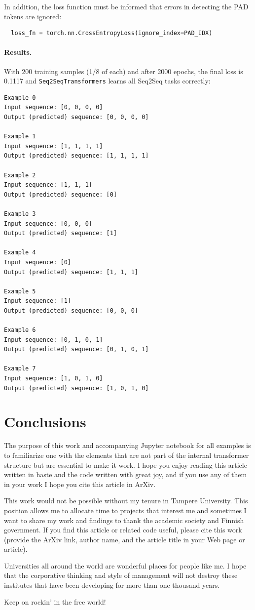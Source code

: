 \documentclass[final]{article}
\begin{document}
In addition, the loss function must be informed that errors in detecting the PAD tokens are ignored:
\begin{lstlisting}
  loss_fn = torch.nn.CrossEntropyLoss(ignore_index=PAD_IDX)
\end{lstlisting}

\paragraph{Results.} With 200 training samples (1/8 of each) and after 2000 epochs, the final loss is 0.1117 and \texttt{Seq2SeqTransformers} learns all Seq2Seq tasks correctly:
\begin{verbatim}
Example 0
Input sequence: [0, 0, 0, 0]
Output (predicted) sequence: [0, 0, 0, 0]

Example 1
Input sequence: [1, 1, 1, 1]
Output (predicted) sequence: [1, 1, 1, 1]

Example 2
Input sequence: [1, 1, 1]
Output (predicted) sequence: [0]

Example 3
Input sequence: [0, 0, 0]
Output (predicted) sequence: [1]

Example 4
Input sequence: [0]
Output (predicted) sequence: [1, 1, 1]

Example 5
Input sequence: [1]
Output (predicted) sequence: [0, 0, 0]

Example 6
Input sequence: [0, 1, 0, 1]
Output (predicted) sequence: [0, 1, 0, 1]

Example 7
Input sequence: [1, 0, 1, 0]
Output (predicted) sequence: [1, 0, 1, 0]
\end{verbatim}

\section{Conclusions}
The purpose of this work and accompanying Jupyter notebook for all examples is to familiarize one with the elements that are not part of the internal transformer structure but are essential to make it work. I hope you enjoy reading this article written in haste and the code written with great joy, and if you use any of them in your work I hope you cite this article in ArXiv.

\begin{ack}
This work would not be possible without my tenure in Tampere
University. This position allows me to allocate time to projects that interest me and sometimes I want to share my work and findings to thank the academic society and Finnish government. If you find this article or
related code useful, please cite this work (provide the ArXiv link, author name, and the article title in your Web page or article).

Universities all around the world are wonderful places for people like
me. I hope that the corporative thinking and style of management will
not destroy these institutes that have been developing for more than one
thousand years.

Keep on rockin' in the free world!
\end{ack}

\printbibliography
\end{document}
